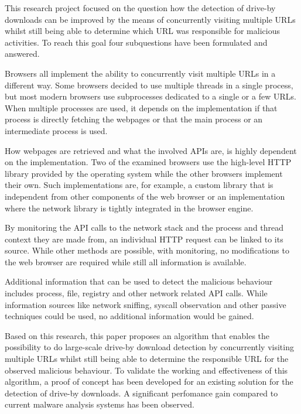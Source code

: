 This research project focused on the question how the detection of drive-by downloads can be improved by the means of concurrently visiting multiple URLs whilst still being able to determine which URL was responsible for malicious activities. To reach this goal four subquestions have been formulated and answered.

Browsers all implement the ability to concurrently visit multiple URLs in a different way. Some browsers decided to use multiple threads in a single process, but most modern browsers use subprocesses dedicated to a single or a few URLs. When multiple processes are used, it depends on the implementation if that process is directly fetching the webpages or that the main process or an intermediate process is used.

How webpages are retrieved and what the involved APIs are, is highly dependent on the implementation. Two of the examined browsers use the high-level HTTP library provided by the operating system while the other browsers implement their own. Such implementations are, for example, a custom library that is independent from other components of the web browser or an implementation where the network library is tightly integrated in the browser engine.

By monitoring the API calls to the network stack and the process and thread context they are made from, an individual HTTP request can be linked to its source. While other methods are possible, with monitoring, no modifications to the web browser are required while still all information is available.

Additional information that can be used to detect the malicious behaviour includes process, file, registry and other network related API calls. While information sources like network sniffing, syscall observation and other passive techniques could be used, no additional information would be gained.

Based on this research, this paper proposes an algorithm that enables the possibility to do large-scale drive-by download detection by concurrently visiting multiple URLs whilst still being able to determine the responsible URL for the observed malicious behaviour. To validate the working and effectiveness of this algorithm, a proof of concept has been developed for an existing solution for the detection of drive-by downloads. A significant perfomance gain compared to current malware analysis systems has been observed.
